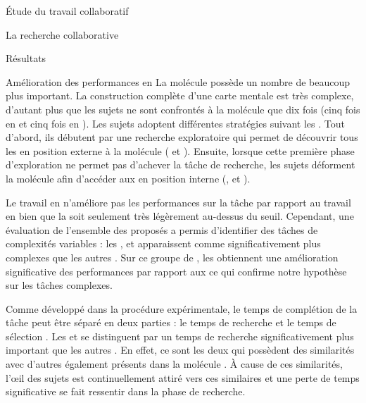 \documentclass[myfrancais]{mythesis}
\begin{document}
\begin{mypart}{Étude du travail collaboratif}
\begin{mychapter}{La recherche collaborative}
\begin{mysection}{Résultats}
\begin{mysubsection}{Amélioration des performances en }
					La molécule \myPrion possède un nombre de  beaucoup plus important.
					La construction complète d'une carte mentale est très complexe, d'autant plus que les sujets ne sont confrontés à la molécule que dix fois (cinq fois en  et cinq fois en ).
					Les sujets adoptent différentes stratégies suivant les .
					Tout d'abord, ils débutent par une recherche exploratoire qui permet de découvrir tous les   en position externe à la molécule ( et ).
					Ensuite, lorsque cette première phase d'exploration ne permet pas d'achever la tâche de recherche, les sujets déforment la molécule afin d'accéder aux  en position interne (,  et ).

					Le travail en  n'améliore pas les performances sur la tâche par rapport au travail en  bien que la \mypvalue soit seulement très légèrement au-dessus du seuil.
					Cependant, une évaluation de l'ensemble des  proposés a permis d'identifier des tâches de complexités variables : les  ,  et  apparaissent comme significativement plus complexes que les autres .
					Sur ce groupe de , les  obtiennent une amélioration significative des performances par rapport aux  ce qui confirme notre hypothèse  sur les tâches complexes.

					Comme développé dans la procédure expérimentale, le temps de complétion de la tâche peut être séparé en deux parties : le temps de recherche et le temps de sélection .
					Les   et  se distinguent par un temps de recherche significativement plus important que les autres .
					En effet, ce sont les deux  qui possèdent des similarités avec d'autres  également présents dans la molécule .
					À cause de ces similarités, l'œil des sujets est continuellement attiré vers ces  similaires et une perte de temps significative se fait ressentir dans la phase de recherche.


\end{mysubsection}
\end{mysection}
\end{mychapter}
\end{mypart}
\end{document}
